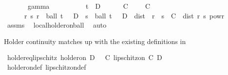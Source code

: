 \begin{isabellebody}
\ \ \ \ \ \ \ gamma{\isacharcolon}{\kern0pt}\ {\isachardoublequoteopen}{\isasymgamma}\ {\isasymin}\ {\isacharbraceleft}{\kern0pt}{}{\isacharless}{\kern0pt}{\isachardot}{\kern0pt}{\isachardot}{\kern0pt}{}{\isacharbraceright}{\kern0pt}{\isachardoublequoteclose}\isanewline
\ \ \ \ \ \ \ {\isachardoublequoteopen}t\ {\isasymin}\ D{\isachardoublequoteclose}\isanewline
\ \ \ \ \ {\isasymepsilon}\ C\ \ {\isachardoublequoteopen}{\isasymepsilon}\ {\isachargreater}{\kern0pt}\ {}{\isachardoublequoteclose}\ {\isachardoublequoteopen}C\ {\isasymge}\ {}{\isachardoublequoteclose}\ \isanewline
\ \ \ \ \ \ {\isachardoublequoteopen}{\isasymAnd}r\ s{\isachardot}{\kern0pt}\ r\ {\isasymin}\ ball\ t\ {\isasymepsilon}\ {\isasyminter}\ D\ {\isasymLongrightarrow}\ s\ {\isasymin}\ ball\ t\ {\isasymepsilon}\ {\isasyminter}\ D\ {\isasymLongrightarrow}\ dist\ {\isacharparenleft}{\kern0pt}{\isasymphi}\ r{\isacharparenright}{\kern0pt}\ {\isacharparenleft}{\kern0pt}{\isasymphi}\ s{\isacharparenright}{\kern0pt}\ {\isasymle}\ C\ {\isacharasterisk}{\kern0pt}\ dist\ r\ s\ powr\ {\isasymgamma}{\isachardoublequoteclose}\isanewline
%
\isadelimproof
\ \ %
\endisadelimproof
%
\isatagproof
{}\isamarkupfalse%
\ assms\ \isamarkupfalse%
\ local{\isacharunderscore}{\kern0pt}holder{\isacharunderscore}{\kern0pt}on{\isacharunderscore}{\kern0pt}ball\ \isamarkupfalse%
\ auto%
\endisatagproof
{\isafoldproof}%
%
\isadelimproof
%
\endisadelimproof
%
\begin{isamarkuptext}%
Holder continuity matches up with the existing definitions in %
\end{isamarkuptext}\isamarkuptrue%
\isamarkupfalse%
\ holder{\isacharunderscore}{\kern0pt}{}{\isacharunderscore}{\kern0pt}eq{\isacharunderscore}{\kern0pt}lipschitz{\isacharcolon}{\kern0pt}\ {\isachardoublequoteopen}{}{\isacharminus}{\kern0pt}holder{\isacharunderscore}{\kern0pt}on\ D\ {\isasymphi}\ {\isacharequal}{\kern0pt}\ {\isacharparenleft}{\kern0pt}{\isasymexists}C{\isachardot}{\kern0pt}\ lipschitz{\isacharunderscore}{\kern0pt}on\ C\ D\ {\isasymphi}{\isacharparenright}{\kern0pt}{\isachardoublequoteclose}\isanewline
%
\isadelimproof
\ \ %
\endisadelimproof
%
\isatagproof
{}\isamarkupfalse%
\ holder{\isacharunderscore}{\kern0pt}on{\isacharunderscore}{\kern0pt}def\ lipschitz{\isacharunderscore}{\kern0pt}on{\isacharunderscore}{\kern0pt}def\ \isamarkupfalse%

\end{isabellebody}
